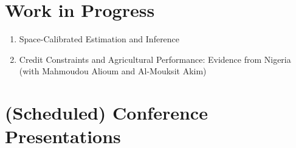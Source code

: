 \documentclass[12pt,letterpaper]{article}
\begin{document}
\section*{Work in Progress}
\begin{enumerate}

\item Space-Calibrated Estimation and Inference %

\item Credit Constraints and Agricultural Performance: Evidence from Nigeria (with Mahmoudou Alioum and Al-Mouksit Akim)
\end{enumerate}

\section*{(Scheduled) Conference Presentations}
\end{document}
